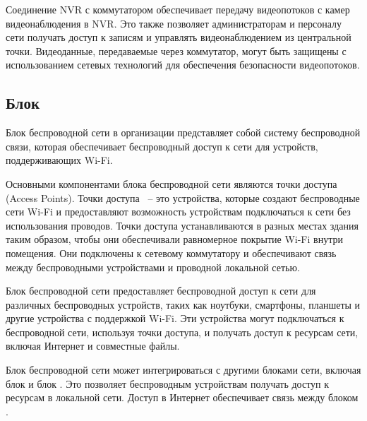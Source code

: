 Соединение NVR с коммутатором обеспечивает передачу видеопотоков с камер видеонаблюдения в NVR.
Это также позволяет администраторам и персоналу сети получать доступ к записям и управлять видеонаблюдением из центральной точки.
Видеоданные, передаваемые через коммутатор, могут быть защищены с использованием сетевых технологий для обеспечения безопасности видеопотоков.

\subsection{Блок \blockAccessPoint}

Блок беспроводной сети в организации представляет собой систему беспроводной связи, 
которая обеспечивает беспроводный доступ к сети для устройств, поддерживающих Wi-Fi.

Основными компонентами блока беспроводной сети являются точки доступа (Access Points). 
Точки доступа ~-- это устройства, которые создают беспроводные сети Wi-Fi и предоставляют возможность устройствам подключаться к сети без использования проводов.
Точки доступа устанавливаются в разных местах здания таким образом, чтобы они обеспечивали равномерное покрытие Wi-Fi внутри помещения.
Они подключены к сетевому коммутатору и обеспечивают связь между беспроводными устройствами и проводной локальной сетью.

Блок беспроводной сети предоставляет беспроводной доступ к сети для различных беспроводных устройств, 
таких как ноутбуки, смартфоны, планшеты и другие устройства с поддержкой Wi-Fi.
Эти устройства могут подключаться к беспроводной сети, используя точки доступа, и получать доступ к ресурсам сети, 
включая Интернет и совместные файлы.

Блок беспроводной сети может интегрироваться с другими блоками сети, включая блок \blockDevices и блок \blockVideo\@. 
Это позволяет беспроводным устройствам получать доступ к ресурсам в локальной сети. Доступ в Интернет обеспечивает связь между блоком \blockSwith\@.